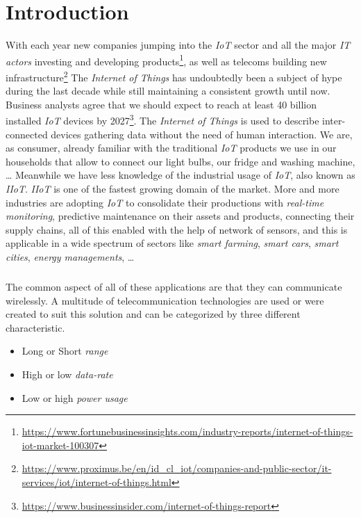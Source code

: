 \chapter{Introduction}

With each year new companies jumping into the \emph{IoT} sector and all the
major \emph{IT actors} investing and developing
products\footnote{\url{https://www.fortunebusinessinsights.com/industry-reports/internet-of-things-iot-market-100307}},
as well as telecoms building new
infrastructure\footnote{\url{https://www.proximus.be/en/id_cl_iot/companies-and-public-sector/it-services/iot/internet-of-things.html}}
The \emph{Internet of Things} has undoubtedly been a subject of hype during the
last decade while still maintaining a consistent growth until now.
Business analysts agree that we should expect to reach at least 40 billion
installed \emph{IoT} devices by
2027\footnote{\url{https://www.businessinsider.com/internet-of-things-report}}. The
\emph{Internet of Things} is used to describe inter-connected devices gathering
data without the need of human interaction.
We are, as consumer, already familiar with the traditional \emph{IoT} products
we use in our households that allow to connect our light bulbs, our fridge and
washing machine, \ldots
Meanwhile we have less knowledge of the industrial usage of \emph{IoT}, also
known as \emph{IIoT}. \emph{IIoT} is one of the fastest growing domain of the
market. More and more industries are adopting \emph{IoT}  to consolidate their
productions with \emph{real-time monitoring}, predictive maintenance on their
assets and products, connecting their supply chains, all of this enabled with
the help of network of sensors, and this is applicable in a wide spectrum of
sectors like \emph{smart farming}, \emph{smart cars}, \emph{smart cities},
\emph{energy managements}, \ldots

\paragraph{}

The common aspect of all of these applications are that they can communicate
wirelessly.
A multitude of telecommunication technologies are used or were created to suit
this solution and can be categorized by three different characteristic.

\begin{itemize}
    \item Long or Short \emph{range}
    \item High or low \emph{data-rate}
    \item Low or high \emph{power usage} 
\end{itemize}

